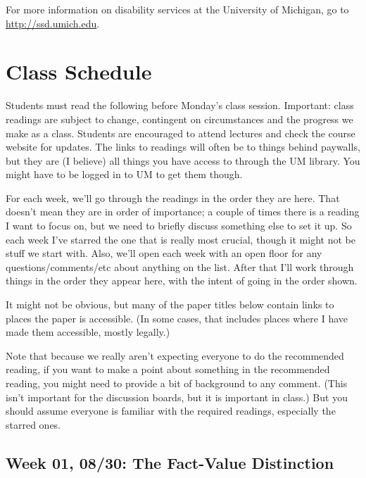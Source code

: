 \documentclass[
]{article}
\begin{document}
For more information on disability services at the University of
Michigan, go to \url{http://ssd.umich.edu}.

\newpage

\hypertarget{class-schedule}{%
\section{Class Schedule}\label{class-schedule}}

Students must read the following before Monday's class session.
Important: class readings are subject to change, contingent on
circumstances and the progress we make as a class. Students are
encouraged to attend lectures and check the course website for updates.
The links to readings will often be to things behind paywalls, but they
are (I believe) all things you have access to through the UM library.
You might have to be logged in to UM to get them though.

For each week, we'll go through the readings in the order they are here.
That doesn't mean they are in order of importance; a couple of times
there is a reading I want to focus on, but we need to briefly discuss
something else to set it up. So each week I've starred the one that is
really most crucial, though it might not be stuff we start with. Also,
we'll open each week with an open floor for any questions/comments/etc
about anything on the list. After that I'll work through things in the
order they appear here, with the intent of going in the order shown.

It might not be obvious, but many of the paper titles below contain
links to places the paper is accessible. (In some cases, that includes
places where I have made them accessible, mostly legally.)

Note that because we really aren't expecting everyone to do the
recommended reading, if you want to make a point about something in the
recommended reading, you might need to provide a bit of background to
any comment. (This isn't important for the discussion boards, but it is
important in class.) But you should assume everyone is familiar with the
required readings, especially the starred ones.

\hypertarget{week-01-0830-the-fact-value-distinction}{%
\subsection{Week 01, 08/30: The Fact-Value
Distinction}\label{week-01-0830-the-fact-value-distinction}}
\end{document}
